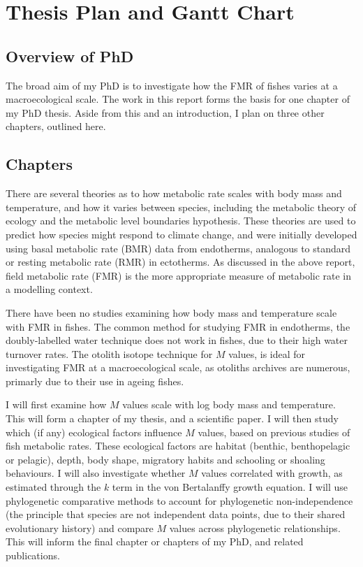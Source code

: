 \documentclass[12pt, titlepage]{article}
\begin{document}
\pagebreak
\section{Thesis Plan and Gantt Chart}

\subsection{Overview of PhD}

The broad aim of my PhD is to investigate how the FMR of fishes varies at a macroecological scale. The work in this report forms the basis for one chapter of my PhD thesis. Aside from this and an introduction, I plan on three other chapters, outlined here.

\subsection{Chapters}

There are several theories as to how metabolic rate scales with body mass and temperature, and how it varies between species, including the metabolic theory of ecology and the metabolic level boundaries hypothesis.
These theories are used to predict how species might respond to climate change, and were initially developed using basal metabolic rate (BMR) data from endotherms, analogous to standard or resting metabolic rate (RMR) in ectotherms.
As discussed in the above report, field metabolic rate (FMR) is the more appropriate measure of metabolic rate in a modelling context.

There have been no studies examining how body mass and temperature scale with FMR in fishes. 
The common method for studying FMR in endotherms, the doubly-labelled water technique %
does not work in fishes, due to their high water turnover rates. %
The otolith isotope technique for $M$ values, is ideal for investigating FMR at a macroecological scale, as otoliths archives are numerous, primarly due to their use in ageing fishes. %

I will first examine how $M$ values scale with log body mass and temperature.
This will form a chapter of my thesis, and a scientific paper.
I will then study which (if any) ecological factors influence $M$ values, based on previous studies of fish metabolic rates.
These ecological factors are habitat (benthic, benthopelagic or pelagic), %
depth, %
body shape, %
migratory habits and schooling or shoaling behaviours.
I will also investigate whether $M$ values correlated with growth, as estimated through the $k$ term in the von Bertalanffy growth equation.
I will use phylogenetic comparative methods to account for phylogenetic non-independence (the principle that species are not independent data points, due to their shared evolutionary history) %
and compare $M$ values across phylogenetic relationships.
This will inform the final chapter or chapters of my PhD, and related publications.
\end{document}
